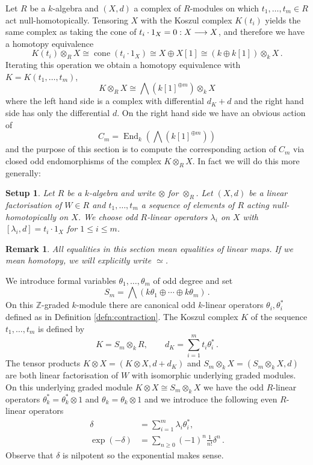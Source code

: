 \documentclass[english,letter paper,12pt,leqno]{article}
\newtheorem{setup}[theorem]{Setup}
\theoremstyle{example}
\newtheorem{remark}[theorem]{Remark}
\numberwithin{equation}{section}
\def\be{\begin{equation}}
\def\ee{\end{equation}}
\def\nZ{\mathds{Z}}
\DeclareMathOperator{\End}{End}
\begin{document}
Let $R$ be a $k$-algebra and $(X,d)$ a complex of $R$-modules on which $t_1,\ldots,t_m \in R$ act null-homotopically. Tensoring $X$ with the Koszul complex $K(t_i)$ yields the same complex as taking the cone of $t_i \cdot 1_X = 0: X \longrightarrow X$, and therefore we have a homotopy equivalence
\be
K(t_i) \otimes_R X \cong \operatorname{cone}( t_i \cdot 1_X ) \cong X \oplus X[1] \cong ( k \oplus k[1] ) \otimes_k X\,.
\ee
Iterating this operation we obtain a homotopy equivalence with $K = K(t_1,\ldots,t_m)$,
\be\label{eq:cliffordactkos_1}
K \otimes_R X \cong \bigwedge( k[1]^{\oplus m} ) \otimes_k X
\ee
where the left hand side is a complex with differential $d_K + d$ and the right hand side has only the differential $d$. On the right hand side we have an obvious action of
\be
C_m = \End_k\left( \bigwedge( k[1]^{\oplus m} ) \right)
\ee
and the purpose of this section is to compute the corresponding action of $C_m$ via closed odd endomorphisms of the complex $K \otimes_R X$. In fact we will do this more generally:

\begin{setup} Let $R$ be a $k$-algebra and write $\otimes$ for $\otimes_R$. Let $(X,d)$ be a linear factorisation of $W \in R$ and $t_1,\ldots,t_m$ a sequence of elements of $R$ acting null-homotopically on $X$. We choose odd $R$-linear operators $\lambda_i$ on $X$ with $[\lambda_i, d] = t_i \cdot 1_X$ for $1 \le i \le m$.
\end{setup}

\begin{remark} All equalities in this section mean equalities of linear maps. If we mean homotopy, we will explicitly write $\simeq$.
\end{remark}

We introduce formal variables $\theta_1,\ldots,\theta_m$ of odd degree and set
\[
S_m = \bigwedge\left( k \theta_1 \oplus \cdots \oplus k \theta_m \right)\,.
\]
On this $\nZ$-graded $k$-module there are canonical odd $k$-linear operators $\theta_i, \theta_i^*$ defined as in Definition \ref{defn:contraction}. The Koszul complex $K$ of the sequence $t_1,\ldots,t_m$ is defined by
\begin{equation}\label{defn:koszul}
K = S_m \otimes_k R, \qquad d_K = \sum_{i=1}^m t_i \theta_i^*\,.
\end{equation} 
The tensor products $K \otimes X = (K \otimes X, d + d_K)$ and $S_m \otimes_k X = ( S_m \otimes_k X, d )$ are both linear factorisation of $W$ with isomorphic underlying graded modules. On this underlying graded module $K \otimes X \cong S_m \otimes_k X$ we have the odd $R$-linear operators $\theta_k^* = \theta_k^* \otimes 1$ and $\theta_k = \theta_k \otimes 1$ and we introduce the following even $R$-linear operators
\begin{align*}
\delta &= \sum_{i=1}^m \lambda_i \theta_i^*,\\
\exp(-\delta) &= \sum_{n \ge 0} (-1)^n \frac{1}{n!} \delta^n\,.
\end{align*}
Observe that $\delta$ is nilpotent so the exponential makes sense.
\end{document}

